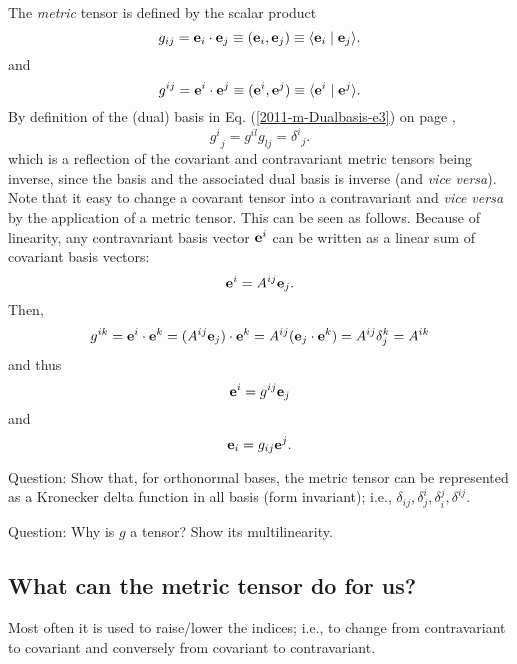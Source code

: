 The {\em metric} tensor is defined by  the scalar product
\begin{equation}
g_{ij}={\bf e}_i\cdot {\bf e}_j\equiv ({\bf e}_i, {\bf e}_j)\equiv \langle {\bf e}_i \mid {\bf e}_j\rangle .
\end{equation}
and
\begin{equation}
g^{ij}={\bf e}^i\cdot {\bf e}^j\equiv ({\bf e}^i, {\bf e}^j)\equiv \langle {\bf e}^i \mid {\bf e}^j\rangle .
\end{equation}
By definition of the (dual) basis in Eq. (\ref{2011-m-Dualbasis-e3}) on page \pageref{2011-m-Dualbasis-e3},
\begin{equation}
{g^i}_{j} =g^{il}g_{lj}={\delta^i}_j .
\end{equation}
which is a reflection of the covariant and contravariant metric tensors being inverse,
since the basis and the associated dual basis is inverse (and {\it vice versa}).
Note that it easy to change a covarant tensor into a contravariant and {\em vice versa}
by the application of a metric tensor.
This can be seen as follows.
Because of linearity, any contravariant basis vector ${\bf e}^i$
can be written as a linear sum of covariant basis vectors:
\begin{equation}
{\bf e}^i=A^{ij}{\bf e}_j.
\end{equation}
Then,
\begin{equation}
g^{ik} ={\bf e}^i\cdot {\bf e}^k =(A^{ij}{\bf e}_j)\cdot {\bf e}^k=A^{ij}({\bf e}_j\cdot {\bf e}^k)=A^{ij}\delta_j^k=A^{ik}
\end{equation}
and thus
\begin{equation}
{\bf e}^i=g^{ij}{\bf e}_j
\end{equation}
and
\begin{equation}
{\bf e}_i=g_{ij}{\bf e}^j.
\end{equation}


Question: Show that, for orthonormal bases, the metric tensor can be
represented as a Kronecker delta function in all basis (form invariant);
i.e.,
$\delta_{ij},\delta^i_j,\delta_i^j,\delta^{ij}$.

Question: Why is $g$ a tensor? Show its multilinearity.

\subsection{What can the metric tensor do for us?}

Most often it is used to raise/lower the indices; i.e.,
to change from contravariant to covariant and conversely from covariant
to contravariant.

